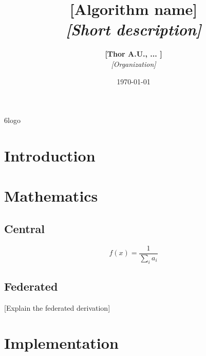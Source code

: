 \documentclass[11pt]{vantage6} %
\title{\textbf{[Algorithm name]} \\ {\Large\itshape [Short description]}} %
\author{\textbf{[Thor A.U., ... ]} \\ \textit{[Organization]}} %
\date{\today} %
\begin{document}
\thispagestyle{firstpage}
\vantage6logo
\vspace{5cm}
\maketitle %
\pagebreak


\tableofcontents
\pagebreak


\section{Introduction}


\section{Mathematics}
\subsection{Central}

\begin{equation}
f(x) = \frac{1}{\sum_i{a_i}}
\end{equation}


\subsection{Federated}
[Explain the federated derivation]


\section{Implementation}
\end{document}
